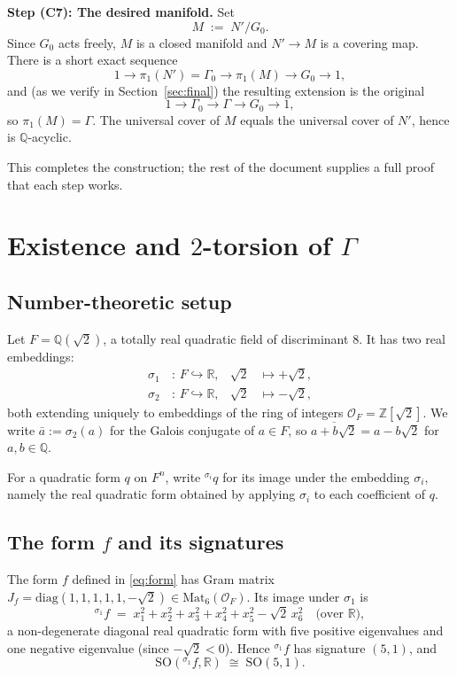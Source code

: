\documentclass[12pt]{article}
\theoremstyle{definition}
\begin{document}
\medskip

\noindent\textbf{Step (C7): The desired manifold.} Set
\[
M \;:=\; N'\big/G_0.
\]
Since $G_0$ acts freely, $M$ is a closed manifold and $N'\to M$ is a covering map. There is a short exact sequence
\[
1 \longrightarrow \pi_1(N')=\Gamma_0 \longrightarrow \pi_1(M) \longrightarrow G_0 \longrightarrow 1,
\]
and (as we verify in Section~\ref{sec:final}) the resulting extension is the original
\[
1 \longrightarrow \Gamma_0 \longrightarrow \Gamma \longrightarrow G_0 \longrightarrow 1,
\]
so $\pi_1(M)=\Gamma$. The universal cover of $M$ equals the universal cover of $N'$, hence is $\mathbb{Q}$-acyclic.

This completes the construction; the rest of the document supplies a full proof that each step works.

\section{Existence and $2$-torsion of $\Gamma$}\label{sec:lattice}

\subsection{Number-theoretic setup}

Let $F=\mathbb{Q}(\sqrt{2})$, a totally real quadratic field of discriminant $8$. It has two real embeddings:
\begin{align*}
\sigma_1 \,&:\, F\hookrightarrow\mathbb{R}, & \sqrt{2}&\mapsto +\sqrt{2}, \\
\sigma_2 \,&:\, F\hookrightarrow\mathbb{R}, & \sqrt{2}&\mapsto -\sqrt{2},
\end{align*}
both extending uniquely to embeddings of the ring of integers $\mathcal{O}_F=\mathbb{Z}[\sqrt{2}]$. We write $\bar{a}:=\sigma_2(a)$ for the Galois conjugate of $a\in F$, so $\overline{a+b\sqrt{2}}=a-b\sqrt{2}$ for $a,b\in\mathbb{Q}$.

For a quadratic form $q$ on $F^n$, write ${}^{\sigma_i}q$ for its image under the embedding $\sigma_i$, namely the real quadratic form obtained by applying $\sigma_i$ to each coefficient of $q$.

\subsection{The form $f$ and its signatures}

The form $f$ defined in \eqref{eq:form} has Gram matrix $J_f=\mathrm{diag}(1,1,1,1,1,-\sqrt{2})\in\mathrm{Mat}_6(\mathcal{O}_F)$. Its image under $\sigma_1$ is
\[
{}^{\sigma_1}\!f \;=\; x_1^2+x_2^2+x_3^2+x_4^2+x_5^2-\sqrt{2}\,x_6^2 \quad \text{(over }\mathbb{R}),
\]
a non-degenerate diagonal real quadratic form with five positive eigenvalues and one negative eigenvalue (since $-\sqrt{2}<0$). Hence ${}^{\sigma_1}\!f$ has signature $(5,1)$, and
\[
\mathrm{SO}({}^{\sigma_1}\!f,\mathbb{R}) \;\cong\; \mathrm{SO}(5,1).
\]
\end{document}
